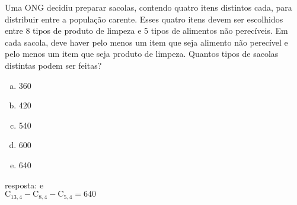 \begin{ex}
 Uma ONG decidiu preparar sacolas, contendo quatro itens distintos cada, para distribuir entre a população carente. Esses quatro itens  devem ser escolhidos entre 8 tipos de produto de limpeza e  5 tipos de alimentos não perecíveis. Em cada sacola, deve haver pelo menos um item que seja alimento não perecível e pelo menos um item que seja produto de limpeza. Quantos tipos de sacolas distintas podem ser feitas?
    \begin{enumerate}[(a)]
    \item 360
    \item 420
    \item 540
    \item 600
    \item 640
    \end{enumerate}
      \begin{sol}
        resposta: e \\
        $\mathrm{C}_{{13},4}-\mathrm{C}_{8,4}-\mathrm{C}_{5,4}=640$
      \end{sol}
\end{ex}
